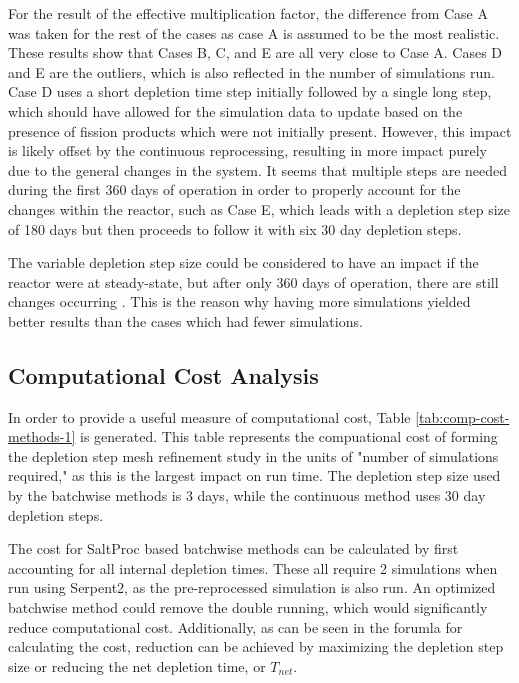 
For the result of the effective multiplication factor, the difference from Case A was taken for the rest of the cases as case A is assumed to be the most realistic.
These results show that Cases B, C, and E are all very close to Case A. Cases D and E are the outliers, which is also reflected in the number of simulations run. Case D uses a short depletion time step initially followed by a single long step, which should have allowed for the simulation data to update based on the presence of fission products which were not initially present.
However, this impact is likely offset by the continuous reprocessing, resulting in more impact purely due to the general changes in the system. It seems that multiple steps are needed during the first 360 days of operation in order to properly account for the changes within the reactor, such as Case E, which leads with a depletion step size of 180 days but then proceeds to follow it with six 30 day depletion steps.

The variable depletion step size could be considered to have an impact if the reactor were at steady-state, but after only 360 days of operation, there are still changes occurring \cite{rykhlevskii_advanced_2018}. This is the reason why having more simulations yielded better results than the cases which had fewer simulations.

\subsection{Computational Cost Analysis}

In order to provide a useful measure of computational cost, Table \ref{tab:comp-cost-methods-1} is generated. This table represents the compuational cost of forming the depletion step mesh refinement study in the units of "number of simulations required," as this is the largest impact on run time. The depletion step size used by the batchwise methods is 3 days, while the continuous method uses 30 day depletion steps.

The cost for SaltProc based batchwise methods can be calculated by first accounting for all internal depletion times. These all require 2 simulations when run using Serpent2, as the pre-reprocessed simulation is also run. An optimized batchwise method could remove the double running, which would significantly reduce computational cost. Additionally, as can be seen in the forumla for calculating the cost, reduction can be achieved by maximizing the depletion step size or reducing the net depletion time, or $T_{net}$.

